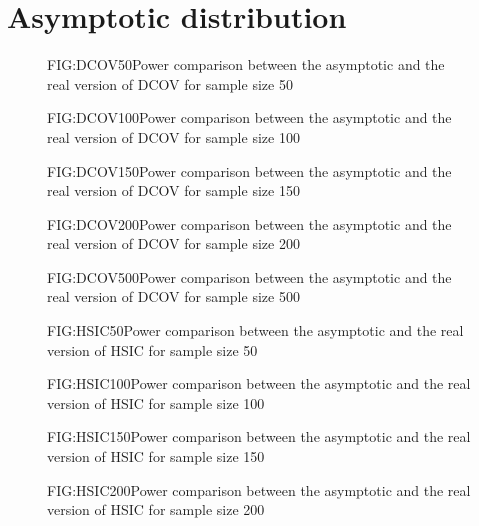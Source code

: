 \section{Asymptotic distribution\label{Appendix:FigurasAsympt}}
\begin{figure}[DCOV asymptotic size 50]{FIG:DCOV50}{Power comparison between the asymptotic and the real version of DCOV for sample size 50}
\end{figure}
\begin{figure}[DCOV asymptotic size 100]{FIG:DCOV100}{Power comparison between the asymptotic and the real version of DCOV for sample size 100}
\end{figure}
\begin{figure}[DCOV asymptotic size 150]{FIG:DCOV150}{Power comparison between the asymptotic and the real version of DCOV for sample size 150}
\end{figure}
\begin{figure}[DCOV asymptotic size 200]{FIG:DCOV200}{Power comparison between the asymptotic and the real version of DCOV for sample size 200}
\end{figure}
\begin{figure}[DCOV asymptotic size 500]{FIG:DCOV500}{Power comparison between the asymptotic and the real version of DCOV for sample size 500}
\end{figure}
\begin{figure}[HSIC asymptotic size 50]{FIG:HSIC50}{Power comparison between the asymptotic and the real version of HSIC for sample size 50}
\end{figure}
\begin{figure}[HSIC asymptotic size 100]{FIG:HSIC100}{Power comparison between the asymptotic and the real version of HSIC for sample size 100}
\end{figure}
\begin{figure}[HSIC asymptotic size 150]{FIG:HSIC150}{Power comparison between the asymptotic and the real version of HSIC for sample size 150}
\end{figure}
\begin{figure}[HSIC asymptotic size 200]{FIG:HSIC200}{Power comparison between the asymptotic and the real version of HSIC for sample size 200}
\end{figure}
